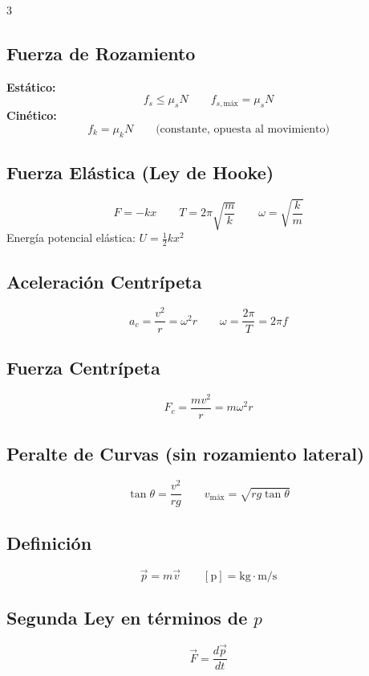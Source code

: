 \documentclass[10pt,landscape]{article}
\begin{document}
\begin{multicols}{3}
\subsection*{Fuerza de Rozamiento}
\textbf{Est\'{a}tico:}
\[
\boxed{f_s \leq \mu_s N} \qquad f_{s,\text{m\'{a}x}} = \mu_s N
\]
\textbf{Cin\'{e}tico:}
\[
\boxed{f_k = \mu_k N} \qquad \text{(constante, opuesta al movimiento)}
\]

\subsection*{Fuerza El\'{a}stica (Ley de Hooke)}
\[
\boxed{F = -kx} \qquad \boxed{T = 2\pi\sqrt{\frac{m}{k}}} \qquad \boxed{\omega = \sqrt{\frac{k}{m}}}
\]
Energ\'{i}a potencial el\'{a}stica: $U = \frac{1}{2}kx^2$

\vspace{4pt}

\subsection*{Aceleraci\'{o}n Centr\'{i}peta}
\[
\boxed{a_c = \frac{v^2}{r} = \omega^2 r} \qquad \boxed{\omega = \frac{2\pi}{T} = 2\pi f}
\]

\subsection*{Fuerza Centr\'{i}peta}
\[
\boxed{F_c = \frac{mv^2}{r} = m\omega^2 r}
\]

\subsection*{Peralte de Curvas (sin rozamiento lateral)}
\[
\boxed{\tan\theta = \frac{v^2}{rg}} \qquad v_{\text{m\'{a}x}} = \sqrt{rg\tan\theta}
\]



\subsection*{Definici\'{o}n}
\[
\boxed{\vec{p} = m\vec{v}} \qquad [\text{p}] = \text{kg}\cdot\text{m/s}
\]

\subsection*{Segunda Ley en t\'{e}rminos de $p$}
\[
\boxed{\vec{F} = \frac{d\vec{p}}{dt}}
\]


\end{multicols}
\end{document}
